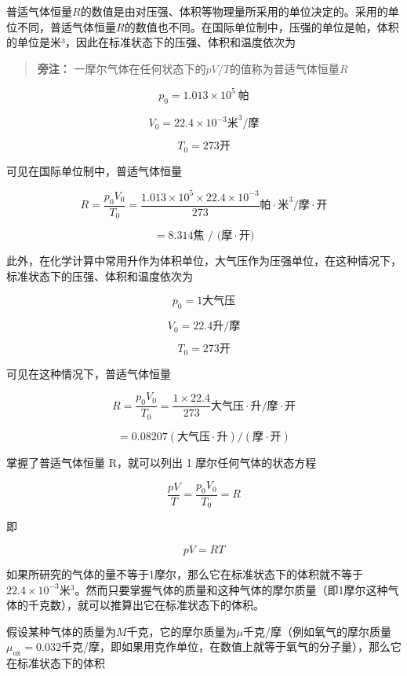 普适气体恒量\(R\)的数值是由对压强、体积等物理量所采用的单位决定的。采用的单位不同，普适气体恒量\(R\)的数值也不同。在国际单位制中，压强的单位是帕，体积的单位是米³，因此在标准状态下的压强、体积和温度依次为

\begin{quote}
\textbf{旁注：}
一摩尔气体在任何状态下的\(pV/T\)的值称为普适气体恒量\(R\)
\end{quote}

\[
p_0=1.013\times10^5\ \text{帕}
\]

\[
V _ {0} = 22.4 \times 10 ^ {- 3} \text{米} ^ {3} / \text{摩}
\]

\[
T _ {0} = 273 \text{开}
\]

可见在国际单位制中，普适气体恒量

\[
R = \frac {p _ {0} V _ {0}}{T _ {0}} = \frac {1.013 \times 10 ^ {5} \times 22.4 \times 10 ^ {- 3}}{273} \text{帕}\mathbin{\cdot}\text{米} ^ {3} / \text{摩}\mathbin{\cdot}\text{开}
\]

\[
= 8.314 \text{焦   /   (摩}\mathbin{\cdot}\text{开)}
\]

此外，在化学计算中常用升作为体积单位，大气压作为压强单位，在这种情况下，标准状态下的压强、体积和温度依次为

\[
p _ {0} = 1 \text{大气压}
\]

\[
V _ {0} = 22.4 \text{升/摩}
\]

\[
T _ {0} = 273 \text{开}
\]

可见在这种情况下，普适气体恒量

\[
R = \frac {p _ {0} V _ {0}}{T _ {0}} = \frac {1 \times 22.4}{273} \text{大气压}\mathbin{\cdot}\text{升/摩}\mathbin{\cdot}\text{开}
\]

\[
= 0.08207 (\text{大气压} \cdot \text{升}) / (\text{摩} \cdot \text{开})
\]

掌握了普适气体恒量 R，就可以列出 1 摩尔任何气体的状态方程

\[
\frac{pV}{T}=\frac{p_0V_0}{T_0}=R
\]

即

\[
p V = R T \tag {5.11}
\]

如果所研究的气体的量不等于1摩尔，那么它在标准状态下的体积就不等于\(22.4\times10^{-3}\)米\(^{3}\)。然而只要掌握气体的质量和这种气体的摩尔质量（即1摩尔这种气体的千克数），就可以推算出它在标准状态下的体积。

假设某种气体的质量为\(M\)千克，它的摩尔质量为\(\mu\)千克/摩（例如氧气的摩尔质量\(\mu_{\mathrm{ox}} = 0.032\)千克/摩，即如果用克作单位，在数值上就等于氧气的分子量），那么它在标准状态下的体积

